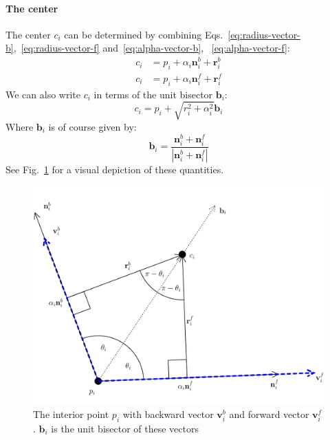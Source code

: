 \documentclass{article}
\begin{document}
\paragraph{The center}
%
The center $c_{i}$ can be determined by combining Eqs.~\eqref{eq:radius-vector-b},~\eqref{eq:radius-vector-f} and~\eqref{eq:alpha-vector-b}, ~\eqref{eq:alpha-vector-f}:
%
\begin{align}
  \label{eq:center-vector-b}
  c_{i} &= p_{i} + \alpha_i\mathbf{n}^b_i + \mathbf{r}^{b}_{i}\\
  \label{eq:center-vector-f}
  c_{i} &= p_{i} + \alpha_i\mathbf{n}^f_i + \mathbf{r}^{f}_{i}
\end{align}
%
We can also write $c_{i}$ in terms of the unit bisector $\mathbf{b}_{i}$:
%
\begin{equation}
  \label{eq:center-bisector}
  c_{i} = p_{i} + \sqrt{r_{i}^{2} + \alpha_{i}^{2}}\mathbf{b}_{i}
\end{equation}
%
Where $\mathbf{b}_i$ is of course given by:
%
\begin{equation}
  \label{eq:bisector}
  \mathbf{b}_i = \frac{\mathbf{n}^b_i + \mathbf{n}^f_i}{\left|\mathbf{n}^b_i + \mathbf{n}^f_i\right|}
\end{equation}
%
See Fig.~\ref{fig:interior-point} for a visual depiction of these quantities.
%
\begin{figure}[h]
  \centering
  \includegraphics[width=\columnwidth]{4}
  \caption{The interior point $p_{i}$ with backward vector $\mathbf{v}^{b}_{i}$ and forward vector $\mathbf{v}^{f}_{i}$. $\mathbf{b}_{i}$ is the unit bisector of these vectors}
  \label{fig:interior-point}
\end{figure}
%
\end{document}
